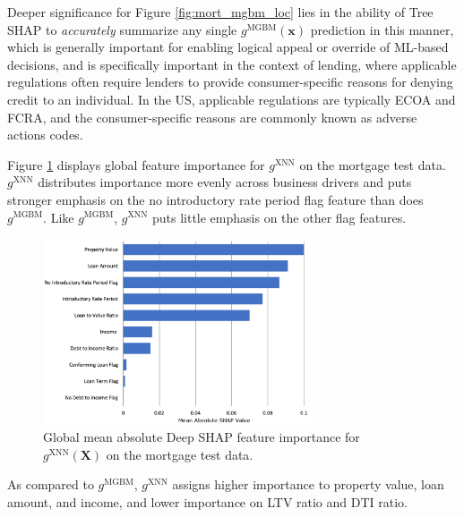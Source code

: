 \documentclass[information,article,submit,moreauthors,pdftex]{definitions/mdpi}
\begin{document}
\noindent Deeper significance for Figure \ref{fig:mort_mgbm_loc} lies in the ability of Tree SHAP to \textit{accurately} summarize any single $g^\text{MGBM}(\mathbf{x})$ prediction in this manner, which is generally important for enabling logical appeal or override of ML-based decisions, and is specifically important in the context of lending, where applicable regulations often require lenders to provide consumer-specific reasons for denying credit to an individual. In the US, applicable regulations are typically ECOA and FCRA, and the consumer-specific reasons are commonly known as adverse actions codes.

Figure \ref{fig:mort_xnn_glob} displays global feature importance for $g^\text{XNN}$ on the mortgage test data. $g^\text{XNN}$ distributes importance more evenly across business drivers and puts stronger emphasis on the no introductory rate period flag feature than does $g^\text{MGBM}$. Like $g^\text{MGBM}$, $g^\text{XNN}$ puts little emphasis on the other flag features.  

\begin{figure}[H]
\centering
\includegraphics[width=8cm]{img/mort_xnn_glob.png}
\caption{Global mean absolute Deep SHAP feature importance for $g^\text{XNN}(\mathbf{X})$ on the mortgage test data.}
\label{fig:mort_xnn_glob}
\end{figure} 

\noindent As compared to $g^\text{MGBM}$, $g^\text{XNN}$ assigns higher importance to property value, loan amount, and income, and lower importance on LTV ratio and DTI ratio. 
\end{document}
